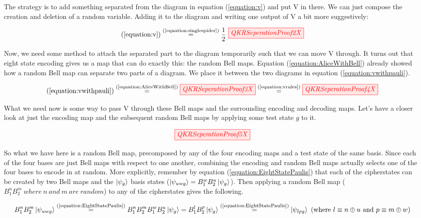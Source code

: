 \documentclass[]{article}
\newcommand{\equaltext}[1]{\ensuremath{\stackrel{\text{#1}}{=}}}
\begin{document}
The strategy is to add something separated from the diagram in equation (\ref{equation:v}) and put V in there. We can just compose the creation and deletion of a random variable. Adding it to the diagram and writing one output of V a bit more suggestively:

\begin{equation}
	\label{equation:vwithpauli}
	(\ref{equation:v}) \equaltext{(\ref{equation:singlespider})} \frac{1}{2}~
	\tikzfig{QKRSeperationProof2X}
\end{equation}

Now, we need some method to attach the separated part to the diagram temporarily such that we can move V through. It turns out that eight state encoding gives us a map that can do exactly this: the random Bell maps. Equation (\ref{equation:AliceWithBell}) already showed how a random Bell map can separate two parts of a diagram. We place it between the two diagrams in equation (\ref{equation:vwithpauli}).

\begin{equation}
\label{equation:movevthrough}
(\ref{equation:vwithpauli}) \equaltext{(\ref{equation:AliceWithBell})} \tikzfig{QKRSeperationProof3X} \equaltext{(\ref{equation:vrules})} \tikzfig{QKRSeperationProof4X}
\end{equation}

What we need now is some way to pass V through these Bell maps and the surrounding encoding and decoding maps. Let's have a closer look at just the encoding map and the subsequent random Bell maps by applying some test state $g$ to it.

\begin{equation}
	\label{equation:RedSpiderRandomPauli}
	\tikzfig{QKRSeperationProof5X}
\end{equation}

So what we have here is a random Bell map, precomposed by any of the four encoding maps and a test state of the same basis. Since each of the four bases are just Bell maps with respect to one another, combining the encoding and random Bell maps actually selects one of the four bases to encode in at random. More explicitly, remember by equation (\ref{equation:EightStatePaulis}) that each of the cipherstates can be created by two Bell maps and the $\ket{\psi_g}$ basis states ($\ket{\psi_{uwg}} = B_1^w B_2^u\ket{\psi_{g}}$). Then applying a random Bell map ($B_1^n B_2^m~where~n~and~m~are~random$) to any of the cipherstates gives the following.

\begin{equation}
\label{equation:EncodingInRandomCipherstate} 
B_1^nB_2^m\ket{\psi_{uwg}} \equaltext{(\ref{equation:EightStatePaulis})}
B_1^nB_2^mB_1^wB_2^u\ket{\psi_{g}} = B_1^lB_2^p\ket{\psi_{g}} \equaltext{(\ref{equation:EightStatePaulis})} \ket{\psi_{lpg}} ~(\text{where}~ l \equiv n \oplus u ~\text{and}~ p \equiv m \oplus w)
\end{equation}
\end{document}
